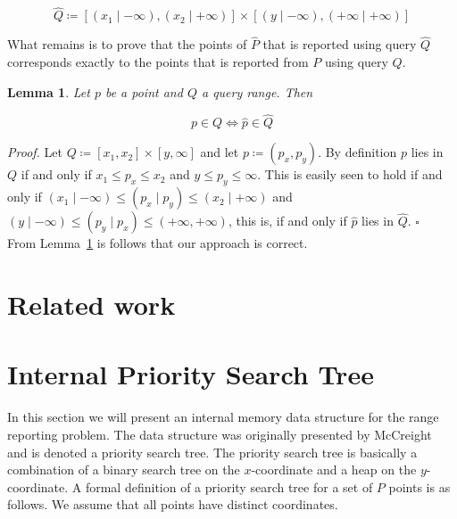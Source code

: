 \documentclass[twoside,11pt,openright]{report}
\newtheorem{lemma}{Lemma}
\begin{document}
$$ \hat{Q} \coloneqq [(x_1 \mid -\infty), (x_2 \mid +\infty)] \times [(y \mid -\infty),(+\infty \mid +\infty)] $$

What remains is to prove that the points of $\hat{P}$ that is reported using query $\hat{Q}$ corresponds exactly to the points that is reported from $P$ using query $Q$.

\begin{lemma}
\label{lma:composite_universe_query}
Let $p$ be a point and $Q$ a query range. Then

$$ p \in Q \Leftrightarrow \hat{p} \in \hat{Q} $$
\end{lemma}

\textit{Proof.} Let $Q \coloneqq [x_1, x_2] \times [y, \infty]$ and let $p \coloneqq (p_x,p_y)$. By definition $p$ lies in $Q$ if and only if $x_1 \leq p_x \leq x_2$ and $y \leq p_y \leq \infty$. This is easily seen to hold if and only if $(x_1 \mid -\infty) \leq (p_x \mid p_y) \leq (x_2 \mid +\infty)$ and $(y \mid -\infty) \leq (p_y \mid p_x) \leq (+\infty, +\infty)$, this is, if and only if $\hat{p}$ lies in $\hat{Q}$. $\square$ \\

From Lemma~\ref{lma:composite_universe_query} is follows that our approach is correct.

\chapter{Related work}



\chapter{Internal Priority Search Tree}
In this section we will present an internal memory data structure for the range reporting problem. The data structure was originally presented by McCreight~\cite{DBLP:journals/siamcomp/McCreight85} and is denoted a priority search tree. The priority search tree is basically a combination of a binary search tree on the $x$-coordinate and a heap on the $y$-coordinate. A formal definition of a priority search tree for a set of $P$ points is as follows. We assume that all points have distinct coordinates.
\end{document}
